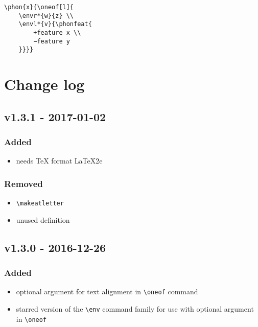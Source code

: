 \documentclass[a4paper]{article}
\begin{document}
\begin{exe}
\ex
\begin{lstlisting}
\phon{x}{\oneof[l]{
    \envr*{w}{z} \\
    \envl*{v}{\phonfeat{
        +feature x \\
        −feature y
    }}}}
\end{lstlisting}
\ex {}
\end{exe}

\section{Change log}

\subsection*{v1.3.1 - 2017-01-02}
\subsubsection*{Added}
\begin{itemize}
    \item needs \TeX{} format \LaTeX2e
\end{itemize}
\subsubsection*{Removed}
\begin{itemize}
    \item \verb+\makeatletter+
    \item unused definition
\end{itemize}

\subsection*{v1.3.0 - 2016-12-26}
\subsubsection*{Added}
\begin{itemize}
    \item optional argument for text alignment in \verb+\oneof+ command
    \item starred version of the \verb+\env+ command family for use with optional argument in \verb+\oneof+
\end{itemize}
\end{document}
